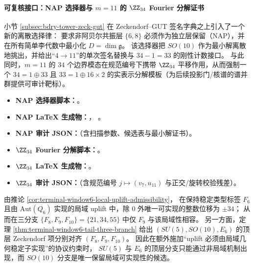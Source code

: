 \paragraph{可复核接口：NAP 选择器与 \texorpdfstring{$m=11$}{m=11} 的 \texorpdfstring{$\ZZ_{34}$}{Z34} Fourier 分解证书}
小节 \ref{subsec:bdry-tower-zeck-gut} 在 Zeckendorf--GUT 签名字典之上引入了一个新的离散选择律：
要求非阿贝尔共振层 \(\{6,8\}\) 必须作为独立层保留（NAP），并在所有简单李代数中最小化 \(D=\dim\mathfrak g\)。
该选择器把 \(SO(10)\) 作为最小解离散地挑出，并给出“\(4\to 11\)”的单次签名替换与 \(34-1=33\) 的刚性计数接口。
与此同时，\(m=11\) 的 \(34\) 个边界模态在规范编号下携带 \(\ZZ_{34}\) 平移作用，从而强制一个
\(34=1\oplus 33\) 且 \(33=1\oplus 16\times 2\) 的实表示分解模板（为后续投影门/核谱的谱并群提供可审计靶标）。
\begin{itemize}
  \item \textbf{NAP 选择器脚本：}\texttt{}。
  \item \textbf{NAP LaTeX 生成物：}\texttt{}，
  \texttt{}。
  \item \textbf{NAP 审计 JSON：}\texttt{}（含扫描参数、候选表与最小解证书）。
  \item \textbf{\(\ZZ_{34}\) Fourier 分解脚本：}\texttt{}。
  \item \textbf{\(\ZZ_{34}\) LaTeX 生成物：}\texttt{}。
  \item \textbf{\(\ZZ_{34}\) 审计 JSON：}\texttt{}（含规范编号 \(j\mapsto (v_7,u_{11})\) 与正交/旋转校验残差）。
\end{itemize}



\begin{remark}\label{rem:window6-local-uplift-excludes-su5-e6}
由推论 \ref{cor:terminal-window6-local-uplift-admissibility}，
在保持稳定类型标签 \(F_6\) 且由 \(\mathrm{Aut}(Q_6)\) 实现的局域 uplift 中，除 \(0\) 外唯一可实现的整数位移为 \(\pm 34\)；
从而在三分支 \(\{F_8,F_9,F_{10}\}=\{21,34,55\}\) 中仅 \(F_9\) 与该局域性相容。
另一方面，定理 \ref{thm:terminal-window6-tail-three-branch} 给出 \((SU(5),SO(10),E_6)\) 的顶层 Zeckendorf 项分别对齐 \((F_8,F_9,F_{10})\)。
因此在额外施加“uplift 必须由局域几何稳定子实现”的协议约束时，
\(SU(5)\) 与 \(E_6\) 的顶层分支只能通过非局域机制出现，而 \(SO(10)\) 分支是唯一保留局域可实现性的候选。
\end{remark}

